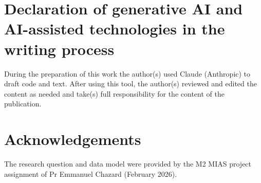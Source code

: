 \documentclass[preprint,12pt]{elsarticle}
\begin{document}
\section*{Declaration of generative AI and AI-assisted technologies in the writing process}
During the preparation of this work the author(s) used Claude (Anthropic) to draft code and text. After using this tool, the author(s) reviewed and edited the content as needed and take(s) full responsibility for the content of the publication.

\section*{Acknowledgements}
The research question and data model were provided by the M2 MIAS project assignment of Pr Emmanuel Chazard (February 2026).



\end{document}
